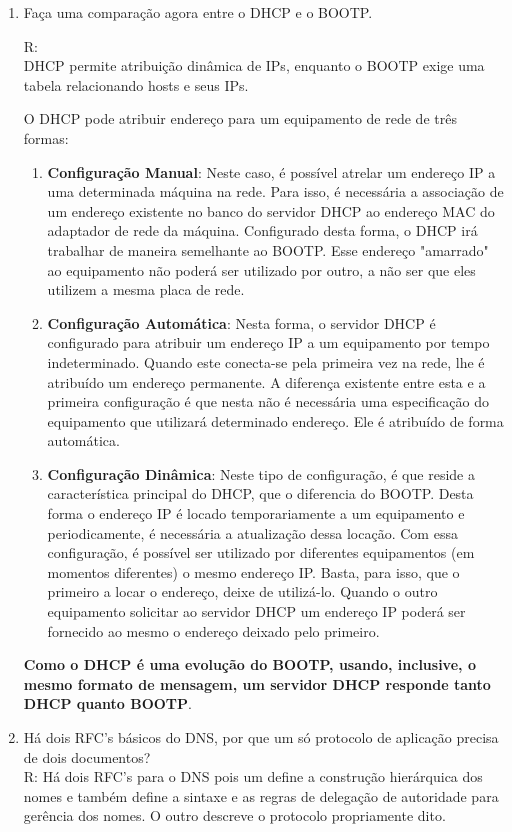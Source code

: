 \documentclass{article}
\begin{document}
\begin{enumerate}
	\item Faça uma comparação agora entre o DHCP e o BOOTP.
	
	R:\\
	DHCP permite atribuição dinâmica de IPs, enquanto o BOOTP exige uma tabela
	relacionando hosts e seus IPs.
	
	O DHCP pode atribuir endereço para um equipamento de rede de três formas:

	\begin{enumerate}
		\item \textbf{Configuração Manual}:
	Neste caso, é possível atrelar um endereço IP a uma determinada máquina na
	rede. Para isso, é necessária a associação de um endereço existente no banco
	do servidor DHCP ao endereço MAC do adaptador de rede da máquina.
	Configurado desta forma, o DHCP irá trabalhar de maneira semelhante ao
	BOOTP. Esse endereço "amarrado" ao equipamento não poderá ser utilizado por
	outro, a não ser que eles utilizem a mesma placa de rede.
		\item \textbf{Configuração Automática}:
	Nesta forma, o servidor DHCP é configurado para atribuir um endereço IP a um
	equipamento por tempo indeterminado. Quando este conecta-se pela primeira
	vez na rede, lhe é atribuído um endereço permanente. A diferença existente
	entre esta e a primeira configuração é que nesta não é necessária uma
	especificação do equipamento que utilizará determinado endereço. Ele é
	atribuído de forma automática.
		\item \textbf{Configuração Dinâmica}:
	Neste tipo de configuração, é que reside a característica principal do DHCP,
	que o diferencia do BOOTP. Desta forma o endereço IP é locado
	temporariamente a um equipamento e periodicamente, é necessária a
	atualização dessa locação. Com essa configuração, é possível ser utilizado
	por diferentes equipamentos (em momentos diferentes) o mesmo endereço IP.
	Basta, para isso, que o primeiro a locar o endereço, deixe de utilizá-lo.
	Quando o outro equipamento solicitar ao servidor DHCP um endereço IP poderá
	ser fornecido ao mesmo o endereço deixado pelo primeiro.
	\end{enumerate}


	\textbf{Como o DHCP é uma evolução do BOOTP, usando, inclusive, o mesmo
	formato de mensagem, um servidor DHCP responde tanto DHCP quanto BOOTP}.


	\item Há dois RFC's básicos do DNS, por que um só protocolo de aplicação precisa de dois documentos?
	\\
	R: Há dois RFC's para o DNS pois um define a construção hierárquica dos nomes e também define a sintaxe e as regras de delegação de autoridade para gerência dos nomes. O outro descreve o protocolo propriamente dito.



\end{enumerate}
\end{document}
